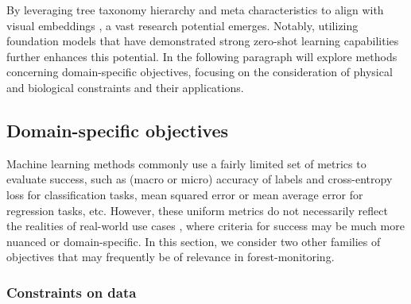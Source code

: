 \documentclass{CUP-JNL-DTM}%
\theoremstyle{definition}
\numberwithin{equation}{section}
\begin{document}
By leveraging tree taxonomy hierarchy and meta characteristics to align with visual embeddings \cite{sumbul_fine-grained_2018}, a vast research potential emerges. 
Notably, utilizing foundation models that have demonstrated strong zero-shot learning capabilities \cite{brown_language_2020, radford_learning_2021} further enhances this potential.
%
In the following paragraph %
will explore methods concerning domain-specific objectives, focusing on the consideration of physical and biological constraints and their applications.






\subsection{Domain-specific objectives}
\label{sec:ml_metrics}

Machine learning methods commonly use a fairly limited set of metrics to evaluate success, such as (macro or micro) accuracy of labels and cross-entropy loss for classification tasks, mean squared error or mean average error for regression tasks, etc. However, these uniform metrics do not necessarily reflect the realities of real-world use cases  \cite{birhane2022values}, where criteria for success may be much more nuanced or domain-specific. In this section, we consider two other families of objectives that may frequently be of relevance in forest-monitoring.
%
%

\subsubsection{Constraints on data}
\label{sec:ml_constraints}
\end{document}
